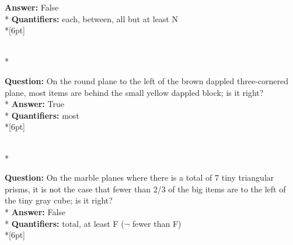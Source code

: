 \begin{figure*}
\begin{minipage}{0.48\textwidth}
\begin{minipage}[t][2.2cm][t]{1\textwidth}
      \textbf{Answer:} False \\*
      \textbf{Quantifiers:} each, between, all but at least N \\*[6pt]
    \end{minipage}\\*
    \begin{minipage}[t][2.2cm][t]{1\textwidth}
      \footnotesize
      \textbf{Question:} On the round plane to the left of the brown dappled three-cornered plane, most items are behind the small yellow dappled block; is it right? \\*
      \textbf{Answer:} True \\*
      \textbf{Quantifiers:} most \\*[6pt]
    \end{minipage}\\*
    \begin{minipage}[t][2.2cm][t]{1\textwidth}
      \footnotesize
      \textbf{Question:} On the marble planes where there is a total of 7 tiny triangular prisms, it is not the case that fewer than 2/3 of the big items are to the left of the tiny gray cube; is it right? \\*
      \textbf{Answer:} False \\*
      \textbf{Quantifiers:} total, at least F ($\neg$ fewer than F) \\*[6pt]
    \end{minipage}
  \end{minipage}
\end{figure*}





